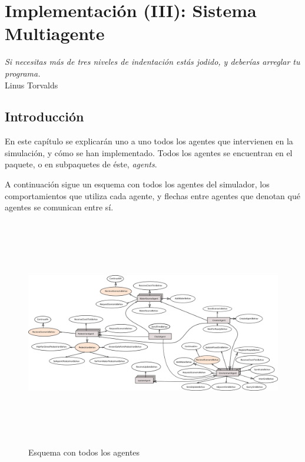 \chapter*{Implementación (III): Sistema Multiagente} \label{cap5c}

\begin{flushright}
\begin{minipage}{7.85cm}
    {\em Si necesitas más de tres niveles de indentación estás jodido, y
    deberías arreglar tu programa.} \\  Linus Torvalds
\end{minipage}
\end{flushright}

\vspace*{5mm}

\section*{Introducción}

En este capítulo se explicarán uno a uno todos los agentes que intervienen en la
simulación, y cómo se han implementado. Todos los agentes se encuentran en el
paquete, o en subpaquetes de éste, {\em agents}.

A continuación sigue un esquema con todos los agentes del simulador, los
comportamientos que utiliza cada agente, y flechas entre agentes que denotan
qué agentes se comunican entre sí.

\begin{figure}[H]
 \centering
 \includegraphics[height=100mm,angle=90]{figuras/cap5/agents.png}
 \caption{Esquema con todos los agentes}
\end{figure}

